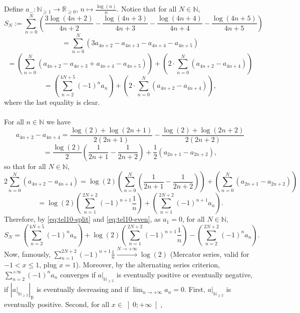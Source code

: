 \begin{solution}
    Define \( a_{-} \colon \mathbb{N}_{\geq 1} \to \mathbb{R}_{\geq 0} \), \( n \mapsto \frac{\log\left(n\right)}{n} \). Notice that for all \( N \in \mathbb{N} \),
    \[
        S_N := \sum_{n=0}^{N} \left(\frac{3\log\left(4n+2\right)}{4n+2}-\frac{\log\left(4n+3\right)}{4n+3}-\frac{\log\left(4n+4\right)}{4n+4}-\frac{\log\left(4n+5\right)}{4n+5}\right)
    \]
    \[
        = \sum_{n=0}^{N} \left(3a_{4n+2}-a_{4n+3}-a_{4n+4}-a_{4n+5}\right)
    \]
    \[
        = \left(\sum_{n=0}^{N} \left(a_{4n+2}-a_{4n+3}+a_{4n+4}-a_{4n+5}\right)\right)+\left(2 \cdot \sum_{n=0}^{N} \left(a_{4n+2}-a_{4n+4}\right)\right)
    \]
    \begin{equation}
        = \left(\sum_{n=2}^{4N+5} \left(-1\right)^n a_n\right)+\left(2 \cdot \sum_{n=0}^{N} \left(a_{4n+2}-a_{4n+4}\right)\right), \label{eq:tel10-split}
    \end{equation}
    where the last equality is clear.
    \\\\
    For all \( n \in \mathbb{N} \) we have
    \[
        a_{4n+2}-a_{4n+4} = \frac{\log\left(2\right)+\log\left(2n+1\right)}{2\left(2n+1\right)}-\frac{\log\left(2\right)+\log\left(2n+2\right)}{2\left(2n+2\right)}
    \]
    \[
        = \frac{\log\left(2\right)}{2}\left(\frac{1}{2n+1}-\frac{1}{2n+2}\right)+\frac{1}{2}\left(a_{2n+1}-a_{2n+2}\right),
    \]
    so that for all \( N \in \mathbb{N} \),
    \[
        2\sum_{n=0}^{N} \left(a_{4n+2}-a_{4n+4}\right) = \log\left(2\right)\left(\sum_{n=0}^{N} \left(\frac{1}{2n+1}-\frac{1}{2n+2}\right)\right)+\left(\sum_{n=0}^{N} \left(a_{2n+1}-a_{2n+2}\right)\right)
    \]
    \begin{equation}
        = \log\left(2\right)\left(\sum_{n=1}^{2N+2} \left(-1\right)^{n+1}\frac{1}{n}\right)+\left(\sum_{n=1}^{2N+2} \left(-1\right)^{n+1} a_n\right). \label{eq:tel10-even}
    \end{equation}
    Therefore, by \eqref{eq:tel10-split} and \eqref{eq:tel10-even}, as \( a_1 = 0 \), for all \( N \in \mathbb{N} \),
    \[
        S_N = \left(\sum_{n=2}^{4N+5} \left(-1\right)^n a_n\right)+\log\left(2\right)\left(\sum_{n=1}^{2N+2} \left(-1\right)^{n+1}\frac{1}{n}\right)-\left(\sum_{n=2}^{2N+2} \left(-1\right)^n a_n\right).
    \]
    Now, famously, \( \sum_{n=1}^{2N+2} \left(-1\right)^{n+1}\frac{1}{n} \overset{N \to +\infty}{\longrightarrow} \log\left(2\right) \) (Mercator series, valid for \( -1 < x \leq 1 \), plug \( x = 1 \)). Moreover, by the alternating series criterion, \( \sum_{n=2}^{+\infty} \left(-1\right)^n a_n \) converges if \( a|_{\mathbb{N}_{\geq 2}} \) is eventually positive or eventually negative, if \( \left|a|_{\mathbb{N}_{\geq 2}}\right|_{\mathbb{R}} \) is eventually decreasing and if \( \lim_{n \to +\infty} a_n = 0 \). First, \( a|_{\mathbb{N}_{\geq 2}} \) is eventually positive. Second, for all \( x \in \left]0;+\infty\right[ \),

\end{solution}
